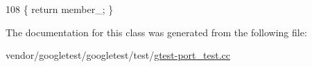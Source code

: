 \begin{DoxyCode}
108 \{ \textcolor{keywordflow}{return} member\_; \}
\end{DoxyCode}


The documentation for this class was generated from the following file\+:\begin{DoxyCompactItemize}
\item 
vendor/googletest/googletest/test/\hyperlink{gtest-port__test_8cc}{gtest-\/port\+\_\+test.\+cc}\end{DoxyCompactItemize}
